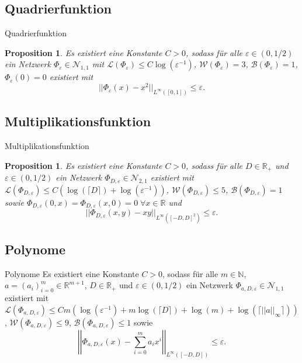 \documentclass[10pt,aspectratio=169]{beamer}
\newtheorem{proposition}[theorem]{Proposition}
\newcommand{\N}{\mathbb{N}} %
\newcommand{\R}{\mathbb{R}} %
\begin{document}
\subsection{Quadrierfunktion}

\begin{frame}{Quadrierfunktion}
    \begin{proposition} %
        Es existiert eine Konstante \(C>0\), sodass für alle \(\varepsilon \in (0,1/2)\) 
        ein Netzwerk \(\Phi_\varepsilon \in \mathcal{N}_{1,1}\) mit 
        \(\mathcal{L}(\Phi_\varepsilon) \leq C\log(\varepsilon^{-1})\), 
        \(\mathcal{W}(\Phi_\varepsilon) = 3\), \(\mathcal{B}(\Phi_\varepsilon) = 1\), 
        \(\Phi_\varepsilon(0) = 0\) existiert mit 
        \[ ||\Phi_\varepsilon(x) - x^2 ||_{L^\infty([0,1])} \leq \varepsilon. \]
    \end{proposition}
\end{frame}

\subsection{Multiplikationsfunktion}

\begin{frame}{Multiplikationsfunktion}
    \begin{proposition} %
        Es existiert eine Konstante \(C>0\), sodass für alle \(D\in \R_+\) und \(\varepsilon \in (0, 1/2)\) 
        ein Netzwerk \(\Phi_{D,\varepsilon} \in \mathcal{N}_{2,1}\) existiert mit 
        \(\mathcal{L}(\Phi_{D, \varepsilon}) \leq C (\log(\lceil D \rceil) + \log(\varepsilon^{-1})) \), 
        \(\mathcal{W}(\Phi_{D, \varepsilon}) \leq 5\), \(\mathcal{B}(\Phi_{D, \varepsilon}) = 1\) sowie 
        \(\Phi_{D,\varepsilon}(0,x) = \Phi_{D,\varepsilon}(x,0) = 0 \;\forall x\in \R\) und 
        \[ ||\Phi_{D,\varepsilon}(x,y) - xy||_{L^\infty([-D,D]^2)} \leq \varepsilon. \]
    \end{proposition}
\end{frame}

\subsection{Polynome}

\begin{frame}{Polynome} %
    \newcommand{\Phia}{\Phi_{a,D,\varepsilon}}
    Es existiert eine Konstante \(C>0\), sodass für alle \(m\in \N\), \(a = (a_i)_{i=0}^m \in \R^{m+1}\), 
    \(D\in \R_+\) und \(\varepsilon \in (0,1/2)\) ein Netzwerk \(\Phia \in \mathcal{N}_{1,1}\) 
    existiert mit \(\mathcal{L}(\Phia) \leq C m (\log(\varepsilon^{-1}) + m\log(\lceil D \rceil) + \log(m) + \log(\lceil ||a||_\infty \rceil))\), 
    \(\mathcal{W}(\Phia) \leq 9\), \(\mathcal{B}(\Phia) \leq 1\) sowie 
    \[ \left|\left|\Phia(x) - \sum_{i=0}^m a_i x^i \right|\right|_{L^\infty([-D,D])} \leq \varepsilon. \]
\end{frame}
\end{document}
